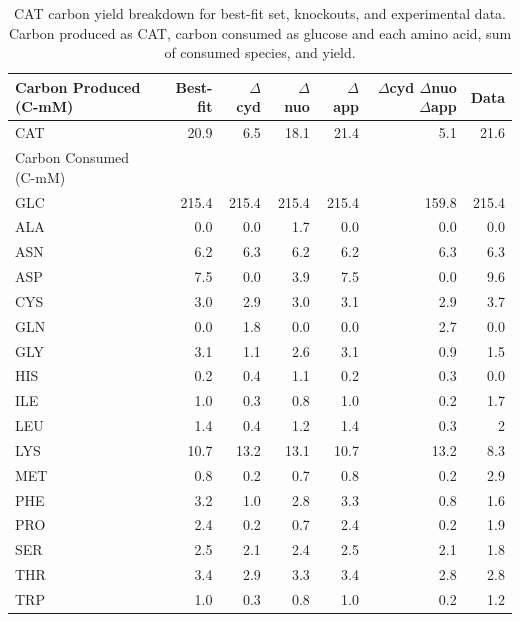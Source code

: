 \documentclass[12pt]{article}
\begin{document}
\begin{table}
\centering
    \caption{CAT carbon yield breakdown for best-fit set, knockouts, and experimental data. Carbon produced as CAT, carbon consumed as glucose and each amino acid, sum of consumed species, and yield.}
    \renewcommand{\arraystretch}{1.3}
    \begin{tabular}{lrrrrrr} \toprule
        Carbon Produced (C-mM) & Best-fit & $\Delta$cyd & $\Delta$nuo & $\Delta$app & \parbox{1 cm}{$\Delta$cyd $\Delta$nuo $\Delta$app} & Data \\ \hline
        CAT & 20.9 & 6.5 & 18.1 & 21.4 & 5.1 & 21.6 \\ \midrule
        Carbon Consumed (C-mM) \\ \hline
        GLC & 215.4 & 215.4 & 215.4 & 215.4 & 159.8 & 215.4 \\ \hline
        ALA & 0.0 & 0.0 & 1.7 & 0.0 & 0.0 & 0.0 \\ \hline
        ASN & 6.2 & 6.3 & 6.2 & 6.2 & 6.3 & 6.3 \\ \hline
        ASP & 7.5 & 0.0 & 3.9 & 7.5 & 0.0 & 9.6 \\ \hline
        CYS & 3.0 & 2.9 & 3.0 & 3.1 & 2.9 & 3.7 \\ \hline
        GLN & 0.0 & 1.8 & 0.0 & 0.0 & 2.7 & 0.0 \\ \hline
        GLY & 3.1 & 1.1 & 2.6 & 3.1 & 0.9 & 1.5 \\ \hline
        HIS & 0.2 & 0.4 & 1.1 & 0.2 & 0.3 & 0.0 \\ \hline
        ILE & 1.0 & 0.3 & 0.8 & 1.0 & 0.2 & 1.7 \\ \hline
        LEU & 1.4 & 0.4 & 1.2 & 1.4 & 0.3 & 2 \\ \hline
        LYS & 10.7 & 13.2 & 13.1 & 10.7 & 13.2 & 8.3 \\ \hline
        MET & 0.8 & 0.2 & 0.7 & 0.8 & 0.2 & 2.9 \\ \hline
        PHE & 3.2 & 1.0 & 2.8 & 3.3 & 0.8 & 1.6 \\ \hline
        PRO & 2.4 & 0.2 & 0.7 & 2.4 & 0.2 & 1.9 \\ \hline
        SER & 2.5 & 2.1 & 2.4 & 2.5 & 2.1 & 1.8 \\ \hline
        THR & 3.4 & 2.9 & 3.3 & 3.4 & 2.8 & 2.8 \\ \hline
        TRP & 1.0 & 0.3 & 0.8 & 1.0 & 0.2 & 1.2 \\ \hline

\end{tabular}
\end{table}
\end{document}
